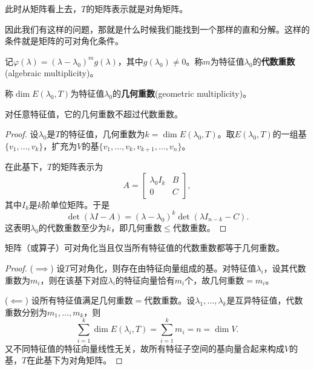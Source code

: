 此时从矩阵看上去，$T$的矩阵表示就是对角矩阵。

因此我们有这样的问题，那就是什么时候我们能找到一个那样的直和分解。这样的条件就是矩阵的可对角化条件。

\begin{definition}[代数重数与几何重数]
    记$\varphi(\lambda) = (\lambda - \lambda_0)^m g(\lambda)$，其中$g(\lambda_0) \neq 0$。称$m$为特征值$\lambda_0$的\textbf{代数重数}(algebraic multiplicity)。

    称$\dim E(\lambda_0, T)$为特征值$\lambda_0$的\textbf{几何重数}(geometric multiplicity)。
\end{definition}

\begin{theorem}
    对任意特征值，它的几何重数不超过代数重数。
\end{theorem}

\begin{proof}
    设$\lambda_0$是$T$的特征值，几何重数为$k = \dim E(\lambda_0, T)$。取$E(\lambda_0, T)$的一组基$\{v_1, \ldots, v_k\}$，扩充为$V$的基$\{v_1, \ldots, v_k, v_{k+1}, \ldots, v_n\}$。

    在此基下，$T$的矩阵表示为
    \begin{equation}
        A = \begin{bmatrix} \lambda_0 I_k & B \\ 0 & C \end{bmatrix},
    \end{equation}
    其中$I_k$是$k$阶单位矩阵。于是
    \begin{equation}
        \det(\lambda I - A) = (\lambda - \lambda_0)^k \det(\lambda I_{n-k} - C).
    \end{equation}
    这表明$\lambda_0$的代数重数至少为$k$，即几何重数$\leq$代数重数。
\end{proof}

\begin{theorem}[对角化判定]
    矩阵（或算子）可对角化当且仅当所有特征值的代数重数都等于几何重数。
\end{theorem}

\begin{proof}
    ($\implies$) 设$T$可对角化，则存在由特征向量组成的基。对特征值$\lambda_i$，设其代数重数为$m_i$，则在该基下对应$\lambda_i$的特征向量恰有$m_i$个，故几何重数$= m_i$。

    ($\impliedby$) 设所有特征值满足几何重数$=$代数重数。设$\lambda_1, \ldots, \lambda_k$是互异特征值，代数重数分别为$m_1, \ldots, m_k$，则
    \begin{equation}
        \sum_{i=1}^{k} \dim E(\lambda_i, T) = \sum_{i=1}^{k} m_i = n = \dim V.
    \end{equation}
    又不同特征值的特征向量线性无关，故所有特征子空间的基向量合起来构成$V$的基，$T$在此基下为对角矩阵。
\end{proof}

